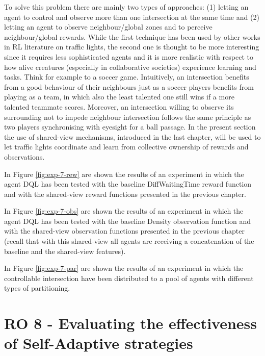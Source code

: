To solve this problem there are mainly two types of approaches: (1) letting an agent to control and observe more than one intersection at the same time and (2) letting an agent to observe neighbour/global zones and to perceive neighbour/global rewards.
While the first technique has been used by other works in RL literature on traffic lights, the second one is thought to be more interesting since it requires less sophisticated agents and it is more realistic with respect to how alive creatures (especially in collaborative societies) experience learning and tasks. Think for example to a soccer game. %
Intuitively, an intersection benefits from a good behaviour of their neighbours just as a soccer players benefits from playing as a team, in which also the least talented one still wins if a more talented teammate scores.
Moreover, an intersection willing to observe its surrounding not to impede neighbour intersection follows the same principle as two players synchronising with eyesight for a ball passage.
In the present section the use of shared-view mechanisms, introduced in the last chapter, will be used to let traffic lights coordinate and learn from collective ownership of rewards and observations. %

In Figure \ref{fig:exp-7-rew} are shown the results of an experiment in which the agent DQL has been tested with the baseline DiffWaitingTime reward function and with the shared-view reward functions presented in the previous chapter.

In Figure \ref{fig:exp-7-obs} are shown the results of an experiment in which the agent DQL has been tested with the baseline Density observation function and with the shared-view observation functions presented in the previous chapter (recall that with this shared-view all agents are receiving a concatenation of the baseline and the shared-view features).

In Figure \ref{fig:exp-7-par} are shown the results of an experiment in which the controllable intersection have been distributed to a pool of agents with different types of partitioning.


\section{RO 8 - Evaluating the effectiveness of Self-Adaptive strategies}
